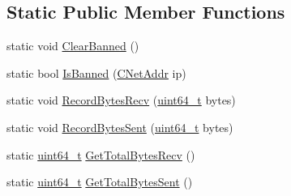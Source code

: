 \subsection*{Static Public Member Functions}
\begin{DoxyCompactItemize}
\item 
static void \hyperlink{class_c_node_ad75b43ab81213b74446163211c24246a}{Clear\+Banned} ()
\item 
static bool \hyperlink{class_c_node_aefa8b81afa53b4c6635dc4c6c024211a}{Is\+Banned} (\hyperlink{class_c_net_addr}{C\+Net\+Addr} ip)
\item 
static void \hyperlink{class_c_node_af72b4b6e454c743af071896019ae1c69}{Record\+Bytes\+Recv} (\hyperlink{stdint_8h_aaa5d1cd013383c889537491c3cfd9aad}{uint64\+\_\+t} bytes)
\item 
static void \hyperlink{class_c_node_a945c993a84eaa9d6bca18284befaccbe}{Record\+Bytes\+Sent} (\hyperlink{stdint_8h_aaa5d1cd013383c889537491c3cfd9aad}{uint64\+\_\+t} bytes)
\item 
static \hyperlink{stdint_8h_aaa5d1cd013383c889537491c3cfd9aad}{uint64\+\_\+t} \hyperlink{class_c_node_a1988b63b48fdc9b72014bdf9588b0168}{Get\+Total\+Bytes\+Recv} ()
\item 
static \hyperlink{stdint_8h_aaa5d1cd013383c889537491c3cfd9aad}{uint64\+\_\+t} \hyperlink{class_c_node_af318a64e7ddad50d1e1b6fc123a5f0b9}{Get\+Total\+Bytes\+Sent} ()
\end{DoxyCompactItemize}
